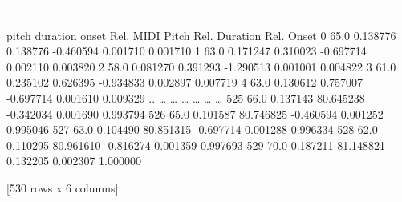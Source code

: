 \documentclass[letterpaper,10pt,english]{sphinxmanual}
\newlength\nbsphinxcodecellspacing
\begin{document}
{

\kern-\sphinxverbatimsmallskipamount\kern-\baselineskip
\kern+\FrameHeightAdjust\kern-\fboxrule
\vspace{\nbsphinxcodecellspacing}

\begin{sphinxVerbatim}[commandchars=\\\{\}]
\llap{\color{nbsphinxout}[37]:\,\hspace{\fboxrule}\hspace{\fboxsep}}     pitch  duration      onset  Rel. MIDI Pitch  Rel. Duration  Rel. Onset
0     65.0  0.138776   0.138776        -0.460594       0.001710    0.001710
1     63.0  0.171247   0.310023        -0.697714       0.002110    0.003820
2     58.0  0.081270   0.391293        -1.290513       0.001001    0.004822
3     61.0  0.235102   0.626395        -0.934833       0.002897    0.007719
4     63.0  0.130612   0.757007        -0.697714       0.001610    0.009329
..     {\ldots}       {\ldots}        {\ldots}              {\ldots}            {\ldots}         {\ldots}
525   66.0  0.137143  80.645238        -0.342034       0.001690    0.993794
526   65.0  0.101587  80.746825        -0.460594       0.001252    0.995046
527   63.0  0.104490  80.851315        -0.697714       0.001288    0.996334
528   62.0  0.110295  80.961610        -0.816274       0.001359    0.997693
529   70.0  0.187211  81.148821         0.132205       0.002307    1.000000

[530 rows x 6 columns]
\end{sphinxVerbatim}
}

{
\begin{sphinxVerbatim}[commandchars=\\\{\}]
\llap{\color{nbsphinxin}[51]:\,\hspace{\fboxrule}\hspace{\fboxsep}}   

   
\end{sphinxVerbatim}
}
\end{document}
